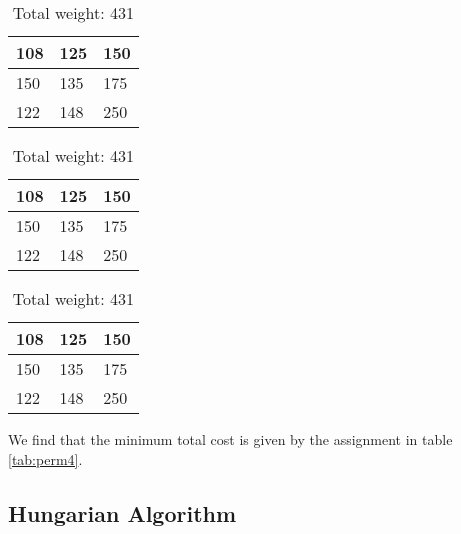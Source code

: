 \begin{table}[H]
    \begin{minipage}[b]{0.3\textwidth}
      \centering
      \begin{tabular}{|m{0.5cm}|m{0.5cm}|m{0.5cm}|}
        \hline
        108 & 125 & \cellcolor{yellow!25} 150 \\
        \hline
        150 & \cellcolor{yellow!25} 135 & 175 \\
        \hline
        \cellcolor{yellow!25} 122 & 148 & 250 \\
        \hline
      \end{tabular}
      \caption{Total weight: 407}
      \label{tab:perm4}
    \end{minipage}
    \hfill
    \begin{minipage}[b]{0.3\textwidth}
      \centering
      \begin{tabular}{|m{0.5cm}|m{0.5cm}|m{0.5cm}|}
        \hline
        108 & \cellcolor{yellow!25} 125 & 150 \\
        \hline
        \cellcolor{yellow!25} 150 & 135 & 175 \\
        \hline
        122 & 148 & \cellcolor{yellow!25} 250 \\
        \hline
      \end{tabular}
      \caption{Total weight: 525}
      \label{tab:perm5}
    \end{minipage}
    \hfill
    \begin{minipage}[b]{0.3\textwidth}
      \centering
      \begin{tabular}{|m{0.5cm}|m{0.5cm}|m{0.5cm}|}
        \hline
        \cellcolor{yellow!25} 108 & 125 & 150 \\
        \hline
        150 & 135 & \cellcolor{yellow!25} 175 \\
        \hline
         122 & \cellcolor{yellow!25} 148 & 250 \\
        \hline
      \end{tabular}
      \caption{Total weight: 431}
      \label{tab:perm6}
    \end{minipage}
  \end{table}
   
We find that the minimum total cost is given by the assignment in table \ref{tab:perm4}.  

\subsection{Hungarian Algorithm}

